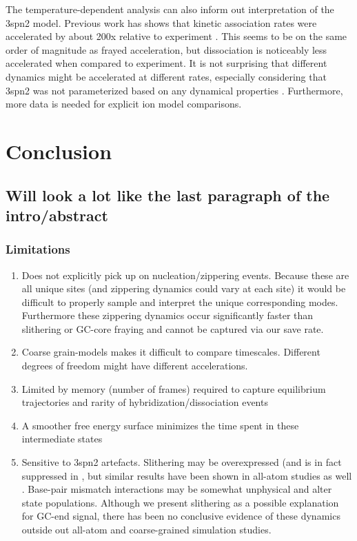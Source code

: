 \documentclass[journal=jpcbfk,manuscript=article]{achemso}
\begin{document}
The temperature-dependent analysis can also inform out interpretation of the 3spn2 model. Previous work has shows that kinetic association rates were accelerated by about 200x relative to experiment \citep{Hinckley2013AnHybridization}. This seems to be on the same order of magnitude as frayed acceleration, but dissociation is noticeably less accelerated when compared to experiment. It is not surprising that different dynamics might be accelerated at different rates, especially considering that 3spn2 was not parameterized based on any dynamical properties \citep{?}. Furthermore, more data is needed for explicit ion model comparisons.


\section{\label{sec:conc}Conclusion}
\subsection{\label{sec:Results}Will look a lot like the last paragraph of the intro/abstract}

\subsubsection{\label{sec:Results}Limitations} 

\begin{enumerate}
	\item Does not explicitly pick up on nucleation/zippering events. Because these are all unique sites (and zippering dynamics could vary at each site) it would be difficult to properly sample and interpret the unique corresponding modes. Furthermore these zippering dynamics occur significantly faster than slithering or GC-core fraying and cannot be captured via our save rate. 
	\item Coarse grain-models makes it difficult to compare timescales. Different degrees of freedom might have different accelerations.
	\item Limited by memory (number of frames) required to capture equilibrium trajectories and rarity of hybridization/dissociation events
	\item A smoother free energy surface minimizes the time spent in these intermediate states
	\item Sensitive to 3spn2 artefacts. Slithering may be overexpressed (and is in fact suppressed in \citep{Romano2013DNADependence}, but similar results have been shown in all-atom studies as well \citep{Xiao2019}. Base-pair mismatch interactions may be somewhat unphysical and alter state populations. Although we present slithering as a possible explanation for GC-end signal, there has been no conclusive evidence of these dynamics outside out all-atom and coarse-grained simulation studies.
\end{enumerate}
\end{document}
